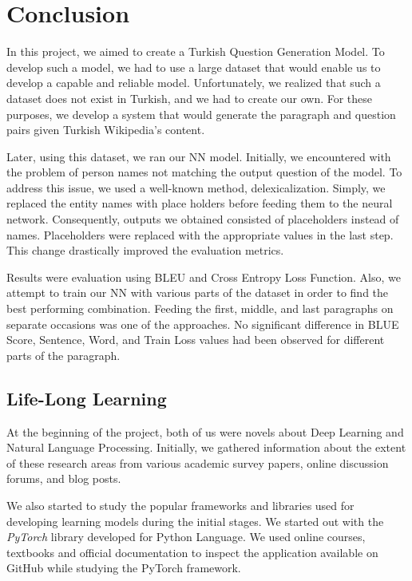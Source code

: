 \documentclass{mefsdp}
\begin{document}
	
	\section{Conclusion}
	In this project, we aimed to create a Turkish Question Generation Model. To develop such a model, we had to use a large dataset that would enable us to develop a capable and reliable model. Unfortunately, we realized that such a dataset does not exist in Turkish, and we had to create our own. For these purposes, we develop a system that would generate the paragraph and question pairs given Turkish Wikipedia's content. \newline \par
	
	Later, using this dataset, we ran our NN model. Initially, we encountered with the problem of person names not matching the output question of the model. To address this issue, we used a well-known method, delexicalization. Simply, we replaced the entity names with place holders before feeding them to the neural network. Consequently, outputs we obtained consisted of placeholders instead of names. Placeholders were replaced with the appropriate values in the last step. This change drastically improved the evaluation metrics. \newline \par  
	
	Results were evaluation using BLEU and Cross Entropy Loss Function. Also, we attempt to train our NN with various parts of the dataset in order to find the best performing combination. Feeding the first, middle, and last paragraphs on separate occasions was one of the approaches. No significant difference in BLUE Score, Sentence, Word, and Train Loss values had been observed for different parts of the paragraph.
	
	
	
	
	\subsection{Life-Long Learning}
	At the beginning of the project, both of us were novels about Deep Learning and Natural Language Processing. Initially, we gathered information about the extent of these research areas from various academic survey papers, online discussion forums, and blog posts. \newline \par
	
	We also started to study the popular frameworks and libraries used for developing learning models during the initial stages. We started out with the \textit{PyTorch} library developed for Python Language. We used online courses, textbooks and official documentation to inspect the application available on GitHub while studying the PyTorch framework. \newline \par
	
\end{document}
